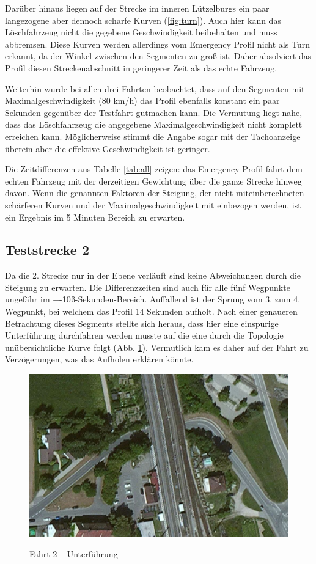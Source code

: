 Darüber hinaus liegen auf der Strecke im inneren Lützelburgs ein paar langezogene aber dennoch scharfe Kurven (\ref{fig:turn}).
Auch hier kann das Löschfahrzeug nicht die gegebene Geschwindigkeit beibehalten und muss abbremsen.
Diese Kurven werden allerdings vom Emergency Profil nicht als Turn erkannt, da der Winkel zwischen den Segmenten zu groß ist.
Daher absolviert das Profil diesen Streckenabschnitt in geringerer Zeit als das echte Fahrzeug.

Weiterhin wurde bei allen drei Fahrten beobachtet, dass auf den Segmenten mit Maximalgeschwindigkeit (80 km/h) das Profil ebenfalls konstant ein paar Sekunden gegenüber der Testfahrt gutmachen kann.
Die Vermutung liegt nahe, dass das Löschfahrzeug die angegebene Maximalgeschwindigkeit nicht komplett erreichen kann.
Möglicherweise stimmt die Angabe sogar mit der Tachoanzeige überein aber die effektive Geschwindigkeit ist geringer.

Die Zeitdifferenzen aus Tabelle \ref{tab:all} zeigen: das Emergency-Profil fährt dem echten Fahrzeug mit der derzeitigen Gewichtung über die ganze Strecke hinweg davon.
Wenn die genannten Faktoren der Steigung, der nicht miteinberechneten schärferen Kurven und der Maximalgeschwindigkeit mit einbezogen werden, ist ein Ergebnis im 5 Minuten Bereich zu erwarten.


\subsection{Teststrecke 2}

Da die 2. Strecke nur in der Ebene verläuft sind keine Abweichungen durch die Steigung zu erwarten.
Die Differenzzeiten sind auch für alle fünf Wegpunkte ungefähr im +-10ß-Sekunden-Bereich.
Auffallend ist der Sprung vom 3. zum 4. Wegpunkt, bei welchem das Profil 14 Sekunden aufholt.
Nach einer genaueren Betrachtung dieses Segments stellte sich heraus, dass hier eine einspurige Unterführung durchfahren werden musste auf die eine durch die Topologie unübersichtliche Kurve folgt (Abb. \ref{fig:traintunnel}).
Vermutlich kam es daher auf der Fahrt zu Verzögerungen, was das Aufholen erklären könnte.

\begin{figure}[h]
\centering
\caption{Fahrt 2 -- Unterführung}
\label{fig:traintunnel}
\includegraphics[width = 0.70 \textwidth]{../media/traintunnel.png} \\
\end{figure}


